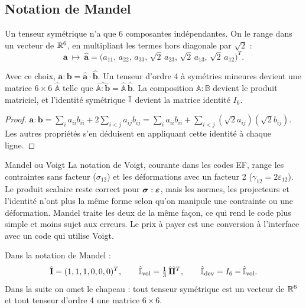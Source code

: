 \subsection{Notation de Mandel}\label{sec:mandel}

Un tenseur symétrique n'a que 6 composantes indépendantes. On le range dans un vecteur de $\mathbb{R}^6$, en multipliant les termes hors diagonale par $\sqrt2$ :
\begin{equation}
\mathbf{a}\ \longmapsto\ \hat{\mathbf{a}} = \big(a_{11},\,a_{22},\,a_{33},\,\sqrt2\,a_{23},\,\sqrt2\,a_{13},\,\sqrt2\,a_{12}\big)^T.
\end{equation}

\begin{proposition}
Avec ce choix, $\mathbf{a}:\mathbf{b} = \hat{\mathbf{a}}\cdot\hat{\mathbf{b}}$. Un tenseur d'ordre 4 à symétries mineures devient une matrice $6\times6$ $\hat{\mathbb{A}}$ telle que $\widehat{\mathbb{A}:\mathbf{b}}=\hat{\mathbb{A}}\,\hat{\mathbf{b}}$. La composition $\mathbb{A}:\mathbb{B}$ devient le produit matriciel, et l'identité symétrique $\mathbb{I}$ devient la matrice identité $I_6$.
\end{proposition}
\begin{proof}
$\mathbf{a}:\mathbf{b} = \sum_i a_{ii}b_{ii} + 2\sum_{i<j}a_{ij}b_{ij} = \sum_i a_{ii}b_{ii} + \sum_{i<j}(\sqrt2a_{ij})(\sqrt2b_{ij})$. Les autres propriétés s'en déduisent en appliquant cette identité à chaque ligne.
\end{proof}

\begin{rappel}{Mandel ou Voigt}
La notation de Voigt, courante dans les codes EF, range les contraintes sans facteur ($\sigma_{12}$) et les déformations avec un facteur 2 ($\gamma_{12}=2\varepsilon_{12}$). Le produit scalaire reste correct pour $\boldsymbol{\sigma}:\boldsymbol{\varepsilon}$, mais les normes, les projecteurs et l'identité n'ont plus la même forme selon qu'on manipule une contrainte ou une déformation. Mandel traite les deux de la même façon, ce qui rend le code plus simple et moins sujet aux erreurs. Le prix à payer est une conversion à l'interface avec un code qui utilise Voigt.
\end{rappel}

Dans la notation de Mandel :
\[
\hat{\mathbf{I}} = (1,1,1,0,0,0)^T,\qquad \hat{\mathbb{I}}_{\mathrm{vol}} = \tfrac13\,\hat{\mathbf{I}}\hat{\mathbf{I}}^T,\qquad \hat{\mathbb{I}}_{\mathrm{dev}} = I_6-\hat{\mathbb{I}}_{\mathrm{vol}}.
\]
Dans la suite on omet le chapeau : tout tenseur symétrique est un vecteur de $\mathbb{R}^6$ et tout tenseur d'ordre 4 une matrice $6\times6$.

